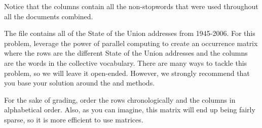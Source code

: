 \begin{problem}
Notice that the columns contain all the non-stopwords that were used throughout all the documents combined.

The  file contains all of the State of the Union addresses from 1945-2006. For this problem, leverage the power of parallel computing to create an occurrence matrix where the rows are the different State of the Union addresses and the columns are the words in the collective vocabulary. There are many ways to tackle this problem, so we will leave it open-ended. However, we strongly recommend that you base your solution around the  and  methods.

For the sake of grading, order the rows chronologically and the columns in alphabetical order. Also, as you can imagine, this matrix will end up being fairly sparse, so it is more efficient to use  matrices.
\end{problem}
